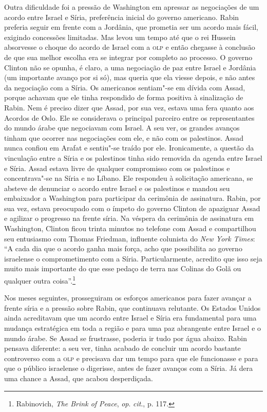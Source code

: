 Outra dificuldade foi a pressão de Washington em apressar as negociações de
um acordo entre Israel e Síria, preferência inicial do governo
americano. Rabin preferia seguir em frente com a Jordânia, que prometia
ser um acordo mais fácil, exigindo concessões limitadas. Mas levou um
tempo até que o rei Hussein absorvesse o choque do acordo de Israel com
a \textsc{olp} e então chegasse à conclusão de que sua melhor escolha era se
integrar por completo ao processo. O governo Clinton não se opunha, é
claro, a uma negociação de paz entre Israel e Jordânia (um importante
avanço por si só), mas queria que ela viesse depois, e não antes da
negociação com a Síria. Os americanos sentiam"-se em dívida com Assad,
porque achavam que ele tinha respondido de forma positiva à sinalização
de Rabin. Nem é preciso dizer que Assad, por sua vez, estava uma fera
quanto aos Acordos de Oslo. Ele se considerava o principal parceiro
entre os representantes do mundo árabe que negociavam com Israel. A seu
ver, os grandes avanços tinham que ocorrer nas negociações com ele, e
não com os palestinos. Assad nunca confiou em Arafat e sentiu"-se traído
por ele. Ironicamente, a questão da vinculação entre a Síria e os
palestinos tinha sido removida da agenda entre Israel e Síria. Assad
estava livre de qualquer compromisso com os palestinos e concentrava"-se
na Síria e no Líbano. Ele respondeu à solicitação americana, se absteve
de denunciar o acordo entre Israel e os palestinos e mandou seu
embaixador a Washington para participar da cerimônia de assinatura.
Rabin, por sua vez, estava preocupado com o ímpeto do governo Clinton de
apaziguar Assad e agilizar o progresso na frente síria. Na véspera da
cerimônia de assinatura em Washington, Clinton ficou trinta minutos no
telefone com Assad e compartilhou seu entusiasmo com Thomas Friedman,
influente colunista do \textit{New York Times}: ``A cada dia que o acordo
ganha mais força, acho que possibilita ao governo israelense o
comprometimento com a Síria. Particularmente, acredito que isso seja
muito mais importante do que esse pedaço de terra nas Colinas do Golã ou
qualquer outra coisa''.\footnote{Rabinovich, \textit{The Brink of Peace},
  \textit{op}. \textit{cit}., p. 117.}

Nos meses seguintes, prosseguiram os esforços americanos para fazer
avançar a frente síria e a pressão sobre Rabin, que continuava
relutante. Os Estados Unidos ainda acreditavam que um acordo entre
Israel e Síria era fundamental para uma mudança estratégica em toda a
região e para uma paz abrangente entre Israel e o mundo árabe. Se Assad
se frustrasse, poderia ir tudo por água abaixo. Rabin pensava diferente:
a seu ver, tinha acabado de concluir um acordo bastante controverso com
a \textsc{olp} e precisava dar um tempo para que ele funcionasse e para que o
público israelense o digerisse, antes de fazer avanços com a Síria. Já
dera uma chance a Assad, que acabou desperdiçada.

